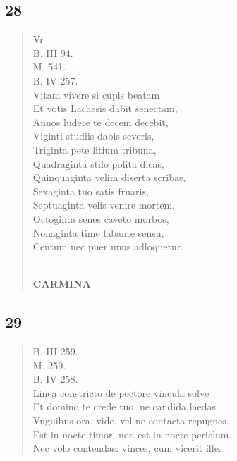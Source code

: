 \documentclass[11pt, a4paper]{report}
\begin{document}
            \subsection*{28}
      \begin{verse}
      Vr \\ B. III 94. \\ M. 541. \\ B. IV 257. \\ Vitam vivere si cupis beatam \\ Et votis Lachesis dabit senectam, \\ Annos ludere te decem decebit, \\ Viginti studiis dabis severis, \\ Triginta pete litium tribuna, \\ Quadraginta stilo polita dicas, \\ Quinquaginta velim diserta scribas, \\ Sexaginta tuo satis fruaris, \\ Septuaginta velis venire mortem, \\ Octoginta senes caveto morbos, \\ Nonaginta time labante sensu, \\ Centum nec puer unus adloquetur. \\ 
        ﻿\pagebreak 
    \begin{center} \textbf{CARMINA} \end{center} \marginpar{[100]} 
      \end{verse}
  
            \subsection*{29}
      \begin{verse}
      B. III 259. \\ M. 259. \\ B. IV 258. \\ Linea constricto de pectore vincula solve \\ Et domino te crede tuo. ne candida laedas \\ Vnguibus ora, vide, vel ne contacta repugnes. \\ Est in nocte timor, non est in nocte periclum. \\ Nec volo contendas: vinces, cum vicerit ille. \\ 
      \end{verse}
  
\end{document}
